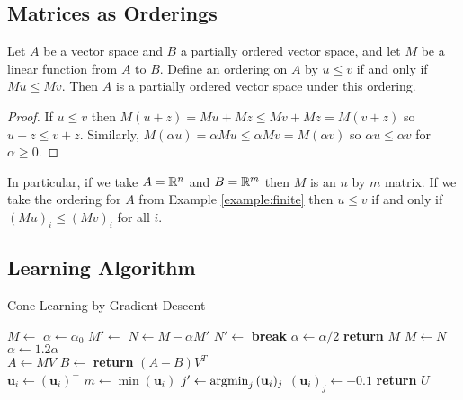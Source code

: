 \subsection{Matrices as Orderings}

\begin{proposition}
  Let $A$ be a vector space and $B$ a partially ordered vector space,
  and let $M$ be a linear function from $A$ to $B$. Define an ordering
  on $A$ by $u\le v$ if and only if $Mu \le Mv$. Then $A$ is a
  partially ordered vector space under this ordering.
\end{proposition}

\begin{proof}
If $u \le v$ then $M(u + z) = Mu + Mz \le Mv + Mz = M(v +
z)$ so $u + z \le v + z$. Similarly, $M(\alpha u) = \alpha Mu
\le\alpha Mv = M(\alpha v)$ so $\alpha u \le \alpha v$ for
$\alpha \ge 0$.
\end{proof}

In particular, if we take $A = \mathbb{R}^n$ and $B = \mathbb{R}^m$ then $M$ is an $n$
by $m$ matrix. If we take the ordering for $A$ from Example
\ref{example:finite} then $u\le v$ if and only if $(Mu)_i \le (Mv)_i$
for all $i$.

\subsection{Learning Algorithm}

\begin{algorithm}
\caption{Cone Learning by Gradient Descent}\label{algorithm:cone}
\begin{algorithmic}
  \State $M \gets$ 
  \State $\alpha \gets \alpha_0$
  \Loop
    \State $M' \gets$ 
    \Loop
      \State $N \gets M - \alpha M'$
      \State $N' \gets$ 
        \State \textbf{break}
      \EndIf
      \State $\alpha \gets \alpha/2$
        \State \textbf{return} $M$
      \EndIf
    \EndLoop
    \State $M \gets N$
    \State $\alpha \gets 1.2\alpha$
  \EndLoop
  \EndProcedure
  \\
  \State $A \gets MV$
  \State $B \gets$ 
  \State \textbf{return} $(A - B)V^T$
  \EndProcedure
  \\
      \State $\mathbf{u}_i \gets (\mathbf{u}_i)^+$
    \Else
      \State $m \gets \min(\mathbf{u}_i)$
        \State $j' \gets \operatorname*{\arg\!\min}_j{(\mathbf{u}_i)_j}$
        \State $(\mathbf{u}_i)_j \gets -0.1$
      \EndIf
    \EndIf
  \EndFor
  \State \textbf{return} $U$
  \EndProcedure
\end{algorithmic}
\end{algorithm}

